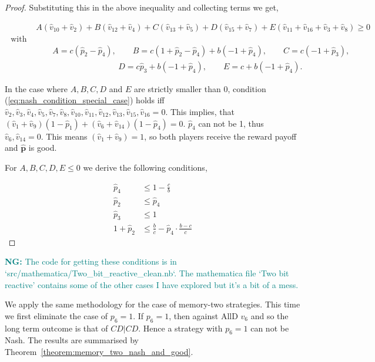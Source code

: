 \documentclass{article}
\theoremstyle{definition}
\newcommand{\nikoleta}[1]{\textcolor{teal}{{\bf NG:} #1}}
\begin{document}
\begin{proof}
  Substituting this in the above inequality and collecting terms we get,
  
  \begin{align}
    & A (\hat{v}_{10} + \hat{v}_{2}) + B (\hat{v}_{12} + \hat{v}_4) 
    + C (\hat{v}_{13} + \hat{v}_5) + D (\hat{v}_{15} + \hat{v}_7) + E (\hat{v}_{11} + \hat{v}_{16} + \hat{v}_3 + \hat{v}_8) \geq  0 \label{eq:nash_condition_special_case} \\ \text{ with } \nonumber \\ 
    & \qquad A = c (\hat{p}_2 \!- \!\hat{p}_4), \qquad B = c (1 + \hat{p}_2 \!- \!\hat{p}_4) + b (-1 + \hat{p}_4), \qquad C = c (-1 + \hat{p}_3),  \nonumber \\
    & \qquad  \qquad  \qquad \qquad \qquad D = c \hat{p}_3 + b (-1 + \hat{p}_4), \qquad E = c + 
    b (-1 + \hat{p}_4). \nonumber
  \end{align}
  
  In the case where \(A, B, C, D\) and \(E\) are strictly smaller than 0, condition
  (\ref{eq:nash_condition_special_case}) holds iff \(\hat{v}_2, \hat{v}_3,
  \hat{v}_4, \hat{v}_5, \hat{v}_7, \hat{v}_8, \hat{v}_{10},
  \hat{v}_{11}, \allowbreak \hat{v}_{12}, \hat{v}_{13}, \hat{v}_{15}, \hat{v}_{16} =
  0\). This implies, that \((\hat{v}_1 + \hat{v}_9) (1 \!- \!\hat{p}_1) + (\hat{v}_6 +
  \hat{v}_{14}) (1 \!- \!\hat{p}_4) = 0\). \(\hat{p}_4\) can not be 1, thus \(\hat{v}_6,
  \hat{v}_{14} = 0\). This means \((\hat{v}_1 + \hat{v}_9) = 1\), so both
  players receive the reward payoff and \(\mathbf{\hat{p}}\) is good.
  
  For \(A, B, C, D, E \leq 0\) we derive the following conditions,
  
  \begin{align}\label{eq:nash_conditions}
    \hat{p}_4       & \leq 1 \!- \!\frac{c}{b} \\
    \hat{p}_2       & \leq \hat{p}_4 \\
    \hat{p}_3       & \leq 1 \\
    1 + \hat{p}_2 & \leq \frac{b}{c} \!- \!\hat{p}_4 \cdot \frac{b\!-\!c}{c}
  \end{align}
  
  \end{proof}
  
\nikoleta{The code for getting these conditions is in `src/mathematica/Two\_bit\_reactive\_clean.nb`.
The mathematica file `Two bit reactive' contains some of the other cases I have
explored but it's a bit of a mess.}

We apply the same methodology for the case of memory-two strategies. This time
we first eliminate the case of \(p_6 = 1\). If \(p_6 = 1\), then against AllD
\(v_6\) and so the long term outcome is that of \(CD|CD\).
Hence a strategy with \(p_6 = 1\) can not be
Nash. The results
are summarised by Theorem~\ref{theorem:memory_two_nash_and_good}.
  
\end{document}
